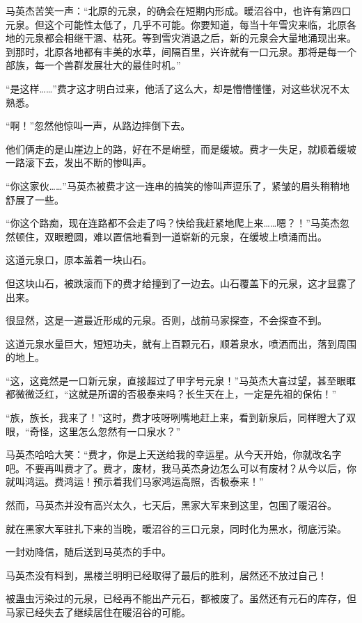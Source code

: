 \begin{this_body}
马英杰苦笑一声：“北原的元泉，的确会在短期内形成。暖沼谷中，也许有第四口元泉。但这个可能性太低了，几乎不可能。你要知道，每当十年雪灾来临，北原各地的元泉都会相继干涸、枯死。等到雪灾消退之后，新的元泉会大量地涌现出来。到那时，北原各地都有丰美的水草，间隔百里，兴许就有一口元泉。那将是每一个部族，每一个兽群发展壮大的最佳时机。”

“是这样……”费才这才明白过来，他活了这么大，却是懵懵懂懂，对这些状况不太熟悉。

“啊！”忽然他惊叫一声，从路边摔倒下去。

他们俩走的是山崖边上的路，好在不是峭壁，而是缓坡。费才一失足，就顺着缓坡一路滚下去，发出不断的惨叫声。

“你这家伙……”马英杰被费才这一连串的搞笑的惨叫声逗乐了，紧皱的眉头稍稍地舒展了一些。

“你这个路痴，现在连路都不会走了吗？快给我赶紧地爬上来……嗯？！”马英杰忽然顿住，双眼瞪圆，难以置信地看到一道崭新的元泉，在缓坡上喷涌而出。

这道元泉口，原本盖着一块山石。

但这块山石，被跌滚而下的费才给撞到了一边去。山石覆盖下的元泉，这才显露了出来。

很显然，这是一道最近形成的元泉。否则，战前马家探查，不会探查不到。

这道元泉水量巨大，短短功夫，就有上百颗元石，顺着泉水，喷洒而出，落到周围的地上。

“这，这竟然是一口新元泉，直接超过了甲字号元泉！”马英杰大喜过望，甚至眼眶都微微泛红，“这就是所谓的否极泰来吗？长生天在上，一定是先祖的保佑！”

“族，族长，我来了！”这时，费才吱呀咧嘴地赶上来，看到新泉后，同样瞪大了双眼，“奇怪，这里怎么忽然有一口泉水？”

马英杰哈哈大笑：“费才，你是上天送给我的幸运星。从今天开始，你就改名字吧。不要再叫费才了。费才，废材，我马英杰身边怎么可以有废材？从今以后，你就叫鸿运。费鸿运！预示着我们马家鸿运高照，否极泰来！”

然而，马英杰并没有高兴太久，七天后，黑家大军来到这里，包围了暖沼谷。

就在黑家大军驻扎下来的当晚，暖沼谷的三口元泉，同时化为黑水，彻底污染。

一封劝降信，随后送到马英杰的手中。

马英杰没有料到，黑楼兰明明已经取得了最后的胜利，居然还不放过自己！

被蛊虫污染过的元泉，已经再不能出产元石，都被废了。虽然还有元石的库存，但马家已经失去了继续居住在暖沼谷的可能。


\end{this_body}
